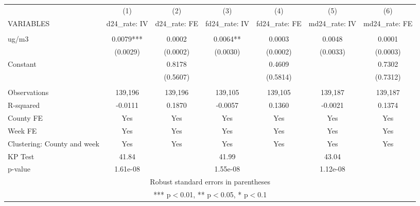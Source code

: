 \begin{tabular}{lcccccc} \hline
 & (1) & (2) & (3) & (4) & (5) & (6) \\
VARIABLES & d24\_rate: IV & d24\_rate: FE & fd24\_rate: IV & fd24\_rate: FE & md24\_rate: IV & md24\_rate: FE \\ \hline
 &  &  &  &  &  &  \\
ug/m3 & 0.0079*** & 0.0002 & 0.0064** & 0.0003 & 0.0048 & 0.0001 \\
 & (0.0029) & (0.0002) & (0.0030) & (0.0002) & (0.0033) & (0.0003) \\
Constant &  & 0.8178 &  & 0.4609 &  & 0.7302 \\
 &  & (0.5607) &  & (0.5814) &  & (0.7312) \\
 &  &  &  &  &  &  \\
Observations & 139,196 & 139,196 & 139,105 & 139,105 & 139,187 & 139,187 \\
R-squared & -0.0111 & 0.1870 & -0.0057 & 0.1360 & -0.0021 & 0.1374 \\
County FE & Yes & Yes & Yes & Yes & Yes & Yes \\
Week FE & Yes & Yes & Yes & Yes & Yes & Yes \\
Clustering: County and week & Yes & Yes & Yes & Yes & Yes & Yes \\
KP Test & 41.84 &  & 41.99 &  & 43.04 &  \\
 p-value & 1.61e-08 &  & 1.55e-08 &  & 1.12e-08 &  \\ \hline
\multicolumn{7}{c}{ Robust standard errors in parentheses} \\
\multicolumn{7}{c}{ *** p$<$0.01, ** p$<$0.05, * p$<$0.1} \\
\end{tabular}

